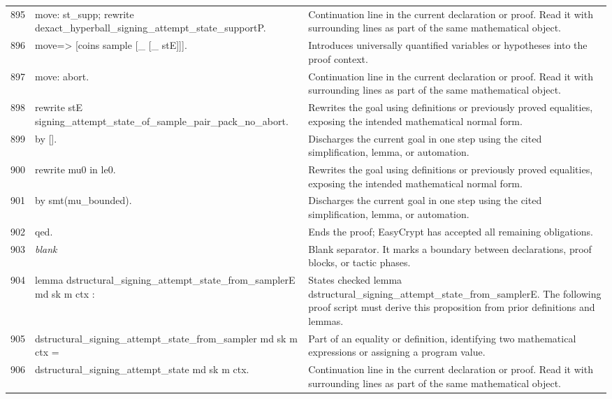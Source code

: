 \documentclass[10pt]{article}
\begin{document}
\begin{longtable}{r L{0.53\textwidth} L{0.37\textwidth}}
895 & {\ttfamily\scriptsize   move: st\_supp; rewrite dexact\_hyperball\_signing\_attempt\_state\_supportP.} & Continuation line in the current declaration or proof.  Read it with surrounding lines as part of the same mathematical object. \\
896 & {\ttfamily\scriptsize   move=> [coins sample [\_ [\_ stE]]].} & Introduces universally quantified variables or hypotheses into the proof context. \\
897 & {\ttfamily\scriptsize   move: abort.} & Continuation line in the current declaration or proof.  Read it with surrounding lines as part of the same mathematical object. \\
898 & {\ttfamily\scriptsize   rewrite stE signing\_attempt\_state\_of\_sample\_pair\_pack\_no\_abort.} & Rewrites the goal using definitions or previously proved equalities, exposing the intended mathematical normal form. \\
899 & {\ttfamily\scriptsize   by [].} & Discharges the current goal in one step using the cited simplification, lemma, or automation. \\
900 & {\ttfamily\scriptsize rewrite mu0 in le0.} & Rewrites the goal using definitions or previously proved equalities, exposing the intended mathematical normal form. \\
901 & {\ttfamily\scriptsize by smt(mu\_bounded).} & Discharges the current goal in one step using the cited simplification, lemma, or automation. \\
902 & {\ttfamily\scriptsize qed.} & Ends the proof; EasyCrypt has accepted all remaining obligations. \\
903 & {\ttfamily\scriptsize \emph{blank}} & Blank separator.  It marks a boundary between declarations, proof blocks, or tactic phases. \\
904 & {\ttfamily\scriptsize lemma dstructural\_signing\_attempt\_state\_from\_samplerE md sk m ctx :} & States checked lemma dstructural\_signing\_attempt\_state\_from\_samplerE.  The following proof script must derive this proposition from prior definitions and lemmas. \\
905 & {\ttfamily\scriptsize   dstructural\_signing\_attempt\_state\_from\_sampler md sk m ctx =} & Part of an equality or definition, identifying two mathematical expressions or assigning a program value. \\
906 & {\ttfamily\scriptsize   dstructural\_signing\_attempt\_state md sk m ctx.} & Continuation line in the current declaration or proof.  Read it with surrounding lines as part of the same mathematical object. \\

\end{longtable}
\end{document}
